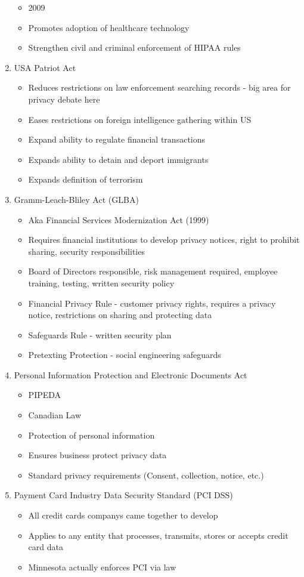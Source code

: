 \documentclass[11pt]{article}
\begin{document}
\begin{enumerate}
\begin{itemize}
\item 2009
\item Promotes adoption of healthcare technology
\item Strengthen civil and criminal enforcement of HIPAA rules
\end{itemize}
\item USA Patriot Act
\label{sec:org09824a1}
\begin{itemize}
\item Reduces restrictions on law enforcement searching records - big area for privacy debate here
\item Eases restrictions on foreign intelligence gathering within US
\item Expand ability to regulate financial transactions
\item Expands ability to detain and deport immigrants
\item Expands definition of terrorism
\end{itemize}
\item Gramm-Leach-Bliley Act (GLBA)
\label{sec:orga626e01}
\begin{itemize}
\item Aka Financial Services Modernization Act (1999)
\item Requires financial institutions to develop privacy notices, right to prohibit sharing, security responsibilities
\item Board of Directors responsible, risk management required, employee training, testing, written security policy
\item Financial Privacy Rule - customer privacy rights, requires a privacy notice, restrictions on sharing and protecting data
\item Safeguards Rule - written security plan
\item Pretexting Protection - social engineering safeguards
\end{itemize}
\item Personal Information Protection and Electronic Documents Act
\label{sec:org9816806}
\begin{itemize}
\item PIPEDA
\item Canadian Law
\item Protection of personal information
\item Ensures business protect privacy data
\item Standard privacy requirements (Consent, collection, notice, etc.)
\end{itemize}
\item Payment Card Industry Data Security Standard (PCI DSS)
\label{sec:orgfd9a5ec}
\begin{itemize}
\item All credit cards companys came together to develop
\item Applies to any entity that processes, transmits, stores or accepts credit card data
\item Minnesota actually enforces PCI via law
\end{itemize}
\end{enumerate}
\end{document}
